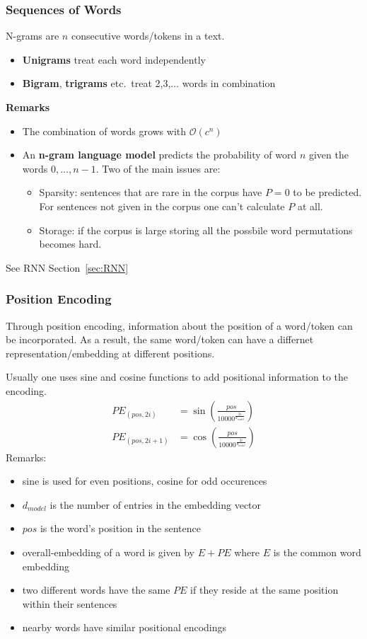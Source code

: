 \subsubsection{Sequences of Words}
N-grams are $n$ consecutive words/tokens in a text.
\begin{itemize}
    \item \textbf{Unigrams} treat each word independently
    \item \textbf{Bigram}, \textbf{trigrams} etc.\ treat 2,3,$\ldots$ words in combination
\end{itemize}
\textbf{Remarks}
\begin{itemize}
    \item The combination of words grows with $\mathcal{O}(c^n)$
    \item An \textbf{n-gram language model} predicts the probability of word $n$ given the words $0,\dots,n-1$. Two of the main issues are:
    \begin{itemize}
        \item Sparsity: sentences that are rare in the corpus have $P=0$ to be predicted. For sentences not given in the corpus one can't calculate $P$ at all.
        \item Storage: if the corpus is large storing all the possbile word permutations becomes hard.
    \end{itemize}
\end{itemize}

\newpar{}
See RNN Section~\ref{sec:RNN}

\subsubsection{Position Encoding}
Through position encoding, information about the position of a word/token can be incorporated. As a result, the same word/token can have a differnet representation/embedding at different positions.
\newpar{}

Usually one uses sine and cosine functions to add positional information to the encoding.
\begin{align*}
    PE_{(pos,2i)}&=\sin\left(\frac{pos}{10000^{\frac{2i}{d_{model}}}}\right)\\
    PE_{(pos,2i+1)}&=\cos\left(\frac{pos}{10000^{\frac{2i}{d_{model}}}}\right)
\end{align*}
Remarks:
\begin{itemize}
    \item sine is used for even positions, cosine for odd occurences
    \item $d_{model}$ is the number of entries in the embedding vector
    \item $pos$ is the word's position in the sentence
    \item overall-embedding of a word is given by $E+PE$ where $E$ is the common word embedding
    \item two different words have the same $PE$ if they reside at the same position within their sentences
    \item nearby words have similar positional encodings
\end{itemize}

